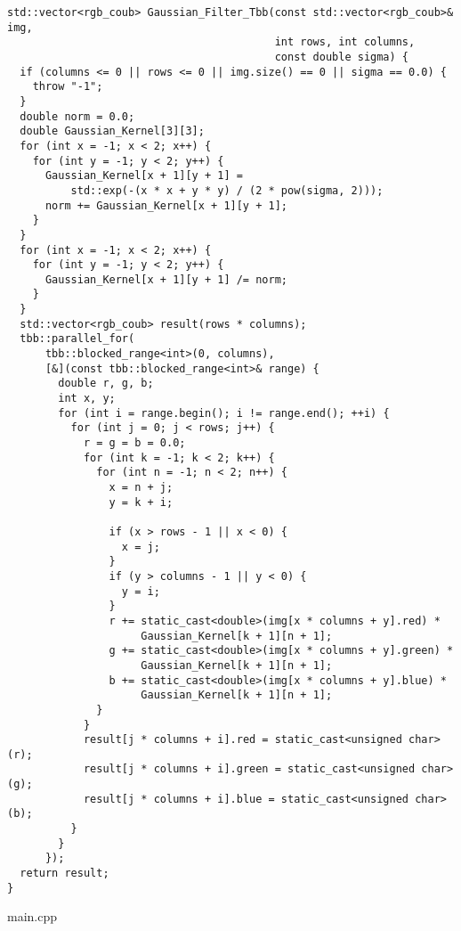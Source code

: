 \documentclass{report}
\begin{document}
\begin{lstlisting}
std::vector<rgb_coub> Gaussian_Filter_Tbb(const std::vector<rgb_coub>& img,
                                          int rows, int columns,
                                          const double sigma) {
  if (columns <= 0 || rows <= 0 || img.size() == 0 || sigma == 0.0) {
    throw "-1";
  }
  double norm = 0.0;
  double Gaussian_Kernel[3][3];
  for (int x = -1; x < 2; x++) {
    for (int y = -1; y < 2; y++) {
      Gaussian_Kernel[x + 1][y + 1] =
          std::exp(-(x * x + y * y) / (2 * pow(sigma, 2)));
      norm += Gaussian_Kernel[x + 1][y + 1];
    }
  }
  for (int x = -1; x < 2; x++) {
    for (int y = -1; y < 2; y++) {
      Gaussian_Kernel[x + 1][y + 1] /= norm;
    }
  }
  std::vector<rgb_coub> result(rows * columns);
  tbb::parallel_for(
      tbb::blocked_range<int>(0, columns),
      [&](const tbb::blocked_range<int>& range) {
        double r, g, b;
        int x, y;
        for (int i = range.begin(); i != range.end(); ++i) {
          for (int j = 0; j < rows; j++) {
            r = g = b = 0.0;
            for (int k = -1; k < 2; k++) {
              for (int n = -1; n < 2; n++) {
                x = n + j;
                y = k + i;

                if (x > rows - 1 || x < 0) {
                  x = j;
                }
                if (y > columns - 1 || y < 0) {
                  y = i;
                }
                r += static_cast<double>(img[x * columns + y].red) *
                     Gaussian_Kernel[k + 1][n + 1];
                g += static_cast<double>(img[x * columns + y].green) *
                     Gaussian_Kernel[k + 1][n + 1];
                b += static_cast<double>(img[x * columns + y].blue) *
                     Gaussian_Kernel[k + 1][n + 1];
              }
            }
            result[j * columns + i].red = static_cast<unsigned char>(r);
            result[j * columns + i].green = static_cast<unsigned char>(g);
            result[j * columns + i].blue = static_cast<unsigned char>(b);
          }
        }
      });
  return result;
}
\end{lstlisting}
main.cpp
\end{document}
